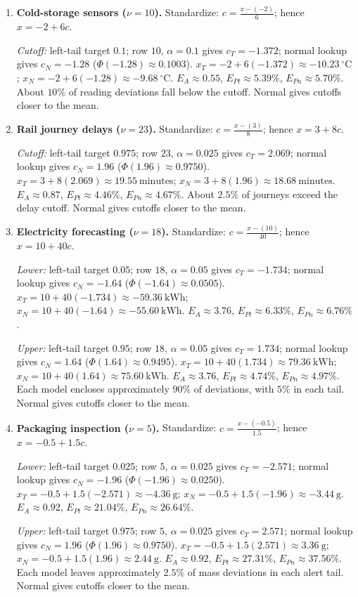 \begin{enumerate}[leftmargin=*,label=\textbf{\arabic*.},itemsep=5pt,parsep=1pt,topsep=3pt]
		\item \textbf{Cold-storage sensors ($\nu=10$).} Standardize: $c=\frac{x-(-2)}{6}$; hence $x=-2+6c$.\par\textit{Cutoff:} left-tail target $0.1$; row $10$, $\alpha=0.1$ gives $c_T=-1.372$; normal lookup gives $c_N=-1.28$ ($\Phi(-1.28)\approx0.1003$). $x_T=-2+6(-1.372)\approx\boxed{-10.23\ {}^\circ\mathrm{C}}$; $x_N=-2+6(-1.28)\approx\boxed{-9.68\ {}^\circ\mathrm{C}}$. $E_A\approx0.55$, $E_{Pt}\approx5.39\%$, $E_{Pn}\approx5.70\%$. About $10\%$ of reading deviations fall below the cutoff. Normal gives cutoffs closer to the mean.
		\item \textbf{Rail journey delays ($\nu=23$).} Standardize: $c=\frac{x-(3)}{8}$; hence $x=3+8c$.\par\textit{Cutoff:} left-tail target $0.975$; row $23$, $\alpha=0.025$ gives $c_T=2.069$; normal lookup gives $c_N=1.96$ ($\Phi(1.96)\approx0.9750$). $x_T=3+8(2.069)\approx\boxed{19.55\ \text{minutes}}$; $x_N=3+8(1.96)\approx\boxed{18.68\ \text{minutes}}$. $E_A\approx0.87$, $E_{Pt}\approx4.46\%$, $E_{Pn}\approx4.67\%$. About $2.5\%$ of journeys exceed the delay cutoff. Normal gives cutoffs closer to the mean.
		\item \textbf{Electricity forecasting ($\nu=18$).} Standardize: $c=\frac{x-(10)}{40}$; hence $x=10+40c$.\par\textit{Lower:} left-tail target $0.05$; row $18$, $\alpha=0.05$ gives $c_T=-1.734$; normal lookup gives $c_N=-1.64$ ($\Phi(-1.64)\approx0.0505$). $x_T=10+40(-1.734)\approx\boxed{-59.36\ \text{kWh}}$; $x_N=10+40(-1.64)\approx\boxed{-55.60\ \text{kWh}}$. $E_A\approx3.76$, $E_{Pt}\approx6.33\%$, $E_{Pn}\approx6.76\%$.\par\textit{Upper:} left-tail target $0.95$; row $18$, $\alpha=0.05$ gives $c_T=1.734$; normal lookup gives $c_N=1.64$ ($\Phi(1.64)\approx0.9495$). $x_T=10+40(1.734)\approx\boxed{79.36\ \text{kWh}}$; $x_N=10+40(1.64)\approx\boxed{75.60\ \text{kWh}}$. $E_A\approx3.76$, $E_{Pt}\approx4.74\%$, $E_{Pn}\approx4.97\%$. Each model encloses approximately $90\%$ of deviations, with $5\%$ in each tail. Normal gives cutoffs closer to the mean.
		\newpage
		\item \textbf{Packaging inspection ($\nu=5$).} Standardize: $c=\frac{x-(-0.5)}{1.5}$; hence $x=-0.5+1.5c$.\par\textit{Lower:} left-tail target $0.025$; row $5$, $\alpha=0.025$ gives $c_T=-2.571$; normal lookup gives $c_N=-1.96$ ($\Phi(-1.96)\approx0.0250$). $x_T=-0.5+1.5(-2.571)\approx\boxed{-4.36\ \text{g}}$; $x_N=-0.5+1.5(-1.96)\approx\boxed{-3.44\ \text{g}}$. $E_A\approx0.92$, $E_{Pt}\approx21.04\%$, $E_{Pn}\approx26.64\%$.\par\textit{Upper:} left-tail target $0.975$; row $5$, $\alpha=0.025$ gives $c_T=2.571$; normal lookup gives $c_N=1.96$ ($\Phi(1.96)\approx0.9750$). $x_T=-0.5+1.5(2.571)\approx\boxed{3.36\ \text{g}}$; $x_N=-0.5+1.5(1.96)\approx\boxed{2.44\ \text{g}}$. $E_A\approx0.92$, $E_{Pt}\approx27.31\%$, $E_{Pn}\approx37.56\%$. Each model leaves approximately $2.5\%$ of mass deviations in each alert tail. Normal gives cutoffs closer to the mean.

\end{enumerate}
